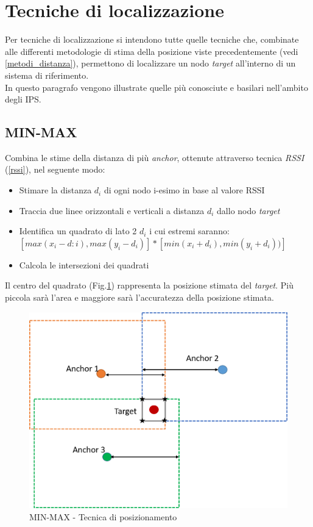 \section{Tecniche di localizzazione}
Per tecniche di localizzazione si intendono tutte quelle tecniche che, combinate alle differenti metodologie di stima della posizione viste precedentemente (vedi \ref{metodi_distanza}), permettono di localizzare un nodo \textit{target} all'interno di un sistema di riferimento.\\
In questo paragrafo vengono illustrate quelle più conosciute e basilari nell'ambito degli IPS.

\subsection{MIN-MAX}
Combina le stime della distanza di più \textit{anchor}, ottenute attraverso tecnica \textit{RSSI} (\ref{rssi}), nel seguente modo:

\begin{itemize}
	\item Stimare la distanza $d_i$ di ogni nodo i-esimo in base al valore RSSI
	\item Traccia due linee orizzontali e verticali a distanza $d_i$ dallo nodo \textit{target}
	\item Identifica un quadrato di lato 2  $d_i$ i cui estremi saranno: \\
			$[max(x_i-d:i),max(y_i-d_i)] * [min(x_i+d_i),min(y_i+d_i))]$
	\item Calcola le intersezioni dei quadrati
\end{itemize}

Il centro del quadrato (Fig.\ref{fig:minmax}) rappresenta la posizione stimata del \textit{target}. Più piccola sarà l’area e maggiore sarà l’accuratezza della posizione stimata.
\begin{figure}[H]  
	\centering 
	\includegraphics[scale=0.4]{ContestoApplicativo/minmax.png}
	\caption{MIN-MAX - Tecnica di posizionamento }
	\label{fig:minmax}
\end{figure}



